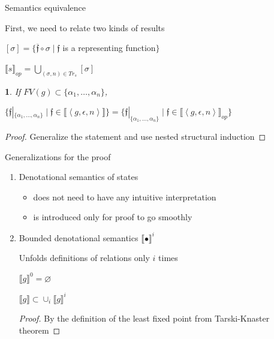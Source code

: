 \documentclass{beamer}
\let\emptyset\varnothing
\newcommand{\sembr}[1]{\llbracket{#1}\rrbracket}
\newcommand{\inbr}[1]{\left<{#1}\right>}
\theoremstyle{definition}
\theoremstyle{plain} %
\newcommand{\thistheoremname}{}
\newtheorem{genericthm}[thm]{\thistheoremname}
\newenvironment{namedthm}[1]
  {\renewcommand{\thistheoremname}{#1}%
   \begin{genericthm}}
  {\end{genericthm}}
\begin{document}
\begin{frame}{Semantics equivalence}

First, we need to relate two kinds of results

\begin{center}

$ [\sigma] = \{ \overline{\mathfrak f} \circ \sigma \mid {\mathfrak f}$ is a representing function$\}$

\vskip5mm

$\llbracket s \rrbracket_{op} = \bigcup\limits_{(\sigma, n) \in Tr_s} [\sigma]$
\end{center}

\pause

\begin{namedthm}{Interleaving search soundness and completeness}
If $FV(g) \subset \{\alpha_1,\dots,\alpha_n\}$,

$
\{ \mathfrak{f}|_{\{\alpha_1,\dots,\alpha_n\}} \mid \mathfrak{f} \in \sembr{\inbr{g, \epsilon, n}} \}
=
\{\mathfrak{f}|_{\{\alpha_1,\dots,\alpha_n\}} \mid \mathfrak{f} \in \sembr{\inbr{g, \epsilon, n}}_{op} \}
$
\end{namedthm}
\begin{proof}
Generalize the statement and use nested structural induction
\end{proof}

\end{frame}



\begin{frame}{Generalizations for the proof}

\begin{enumerate}

\item Denotational semantics of states

\begin{itemize}

\item does not need to have any intuitive interpretation

\item is introduced only for proof to go smoothly

\end{itemize}

\item Bounded denotational semantics $\sembr{\bullet}^i$

\vskip3mm

Unfolds definitions of relations only $i$ times

\vskip3mm

$\sembr{g}^0 = \emptyset$

\begin{lemma}
$\sembr{g} \subset \cup_i \sembr{g}^i$
\end{lemma}
\begin{proof}
By the definition of the least fixed point from Tarski-Knaster theorem
\end{proof}


\end{enumerate}

\end{frame}
\end{document}
